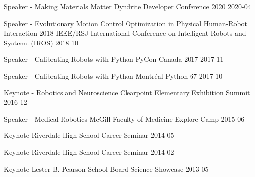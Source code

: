 \begin{cvhonors}

\cvhonor
{Speaker - Making Materials Matter}
{Dyndrite Developer Conference 2020}
{}
{2020-04}

\cvhonor
{Speaker - Evolutionary Motion Control Optimization in Physical Human-Robot Interaction}
{2018 IEEE/RSJ International Conference on Intelligent Robots and Systems (IROS)}
{}
{2018-10}

\cvhonor
{Speaker - Calibrating Robots with Python}
{PyCon Canada 2017}
{}
{2017-11}

\cvhonor
{Speaker - Calibrating Robots with Python}
{Montréal-Python 67}
{}
{2017-10}

\cvhonor
{Keynote - Robotics and Neuroscience}
{Clearpoint Elementary Exhibition Summit}
{}
{2016-12}

\cvhonor
{Speaker - Medical Robotics}
{McGill Faculty of Medicine Explore Camp}
{}
{2015-06}

\cvhonor
{Keynote}
{Riverdale High School Career Seminar}
{}
{2014-05}

\cvhonor
{Keynote}
{Riverdale High School Career Seminar}
{}
{2014-02}

\cvhonor
{Keynote}
{Lester B. Pearson School Board Science Showcase}
{}
{2013-05}

\end{cvhonors}
